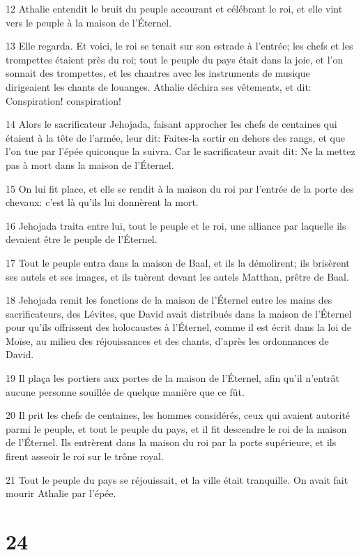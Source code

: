 \par 12 Athalie entendit le bruit du peuple accourant et célébrant le roi, et elle vint vers le peuple à la maison de l'Éternel.
\par 13 Elle regarda. Et voici, le roi se tenait sur son estrade à l'entrée; les chefs et les trompettes étaient près du roi; tout le peuple du pays était dans la joie, et l'on sonnait des trompettes, et les chantres avec les instruments de musique dirigeaient les chants de louanges. Athalie déchira ses vêtements, et dit: Conspiration! conspiration!
\par 14 Alors le sacrificateur Jehojada, faisant approcher les chefs de centaines qui étaient à la tête de l'armée, leur dit: Faites-la sortir en dehors des rangs, et que l'on tue par l'épée quiconque la suivra. Car le sacrificateur avait dit: Ne la mettez pas à mort dans la maison de l'Éternel.
\par 15 On lui fit place, et elle se rendit à la maison du roi par l'entrée de la porte des chevaux: c'est là qu'ils lui donnèrent la mort.
\par 16 Jehojada traita entre lui, tout le peuple et le roi, une alliance par laquelle ils devaient être le peuple de l'Éternel.
\par 17 Tout le peuple entra dans la maison de Baal, et ils la démolirent; ils brisèrent ses autels et ses images, et ils tuèrent devant les autels Matthan, prêtre de Baal.
\par 18 Jehojada remit les fonctions de la maison de l'Éternel entre les mains des sacrificateurs, des Lévites, que David avait distribués dans la maison de l'Éternel pour qu'ils offrissent des holocaustes à l'Éternel, comme il est écrit dans la loi de Moïse, au milieu des réjouissances et des chants, d'après les ordonnances de David.
\par 19 Il plaça les portiers aux portes de la maison de l'Éternel, afin qu'il n'entrât aucune personne souillée de quelque manière que ce fût.
\par 20 Il prit les chefs de centaines, les hommes considérés, ceux qui avaient autorité parmi le peuple, et tout le peuple du pays, et il fit descendre le roi de la maison de l'Éternel. Ils entrèrent dans la maison du roi par la porte supérieure, et ils firent asseoir le roi sur le trône royal.
\par 21 Tout le peuple du pays se réjouissait, et la ville était tranquille. On avait fait mourir Athalie par l'épée.

\chapter{24}

